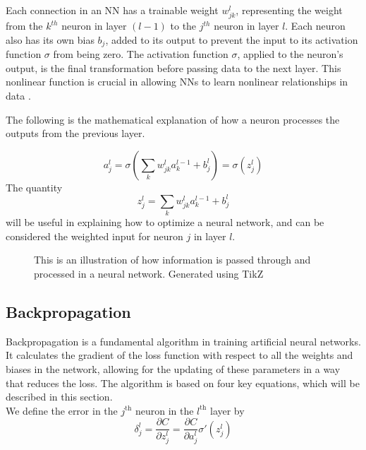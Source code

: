 Each connection in an NN has a trainable weight $w_{jk}^l$, representing the weight from the $k^{th}$ neuron in layer $(l-1)$ to the $j^{th}$ neuron in layer $l$.
Each neuron also has its own bias $b_j$, added to its output to prevent the input to its activation function $\sigma$ from being zero.
The activation function $\sigma$, applied to the neuron's output, is the final transformation before passing data to the next layer.
This nonlinear function is crucial in allowing NNs to learn nonlinear relationships in data \cite{universal_approximation}.

The following is the mathematical explanation of how a neuron processes the outputs from the previous layer.

\begin{equation} \label{eq:act_neuron}
    a_{j}^l = \sigma\left(\sum_k w_{jk}^l a^{l-1}_k+b_j^l \right) = \sigma(z_j^l)
\end{equation}
The quantity 
\begin{equation}\label{eq:z_neuron}
    z_j^l = \sum_{k} w_{jk}^l a^{l-1}_k+b_j^l
\end{equation}
 will be useful in explaining how to optimize a neural network, and can be considered the weighted input for neuron $j$ in layer $l$.


\begin{figure}[H]
    \centering
    
    \caption{This is an illustration of how information is passed through and processed in a neural network.
Generated using TikZ \cite{tikz}}
    \label{fig:nnfig}
\end{figure}
\subsection{Backpropagation}

Backpropagation\cite{backprop_original} is a fundamental algorithm in training artificial neural networks.
It calculates the gradient of the loss function with respect to all the weights and biases in the network,
allowing for the updating of these parameters in a way that reduces the loss.
The algorithm is based on four key equations, which will be described in this section.\\

We define the error in the $j^\text{th}$ neuron in the $l^\text{th}$ layer by
\begin{equation}\label{eq:bp1} 
    \delta_j^l = \frac{\partial C}{\partial z_j^l} = \frac{\partial C}{\partial a_j^l} \sigma '(z_j^l)
\end{equation}

